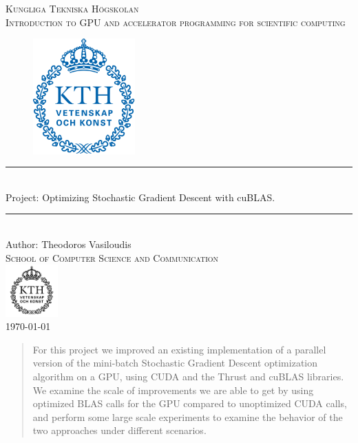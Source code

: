 \documentclass[11pt,a4paper]{article}
\newcommand{\HRule}{\rule{\linewidth}{0.5mm}}
\begin{document}
\begin{titlepage}
\begin{center}

\textsc{\LARGE Kungliga Tekniska Högskolan}\\[1.0cm]

\textsc{\Large Introduction to GPU and accelerator programming for scientific computing}\\[2.0cm]



\begin{figure}[H]
	\centering
 \includegraphics[width=0.35\textwidth]{Kth_logo.png}
\end{figure}
%

\HRule \\[0.4cm]
{ \huge  Project: Optimizing Stochastic Gradient Descent with cuBLAS.
}\\[0.4cm]
\HRule \\[1.5cm]


Author: Theodoros Vasiloudis   \\

\textsc{\Large School of Computer Science and Communication}\\ [1.0cm]
\includegraphics[width=0.15\textwidth]{KTH_black.png}\\[1.5cm] %
{\large \today}

\end{center}
\end{titlepage}

\begin{abstract}
For this project we improved an existing implementation of a parallel version of the mini-batch
Stochastic Gradient Descent optimization algorithm on a GPU, using
CUDA and the Thrust and cuBLAS libraries. We examine the scale of improvements
we are able to get by using optimized BLAS calls for the GPU compared to unoptimized CUDA calls, and perform
some large scale experiments to examine the behavior of the two approaches
under different scenarios.

\end{abstract}
\end{document}
